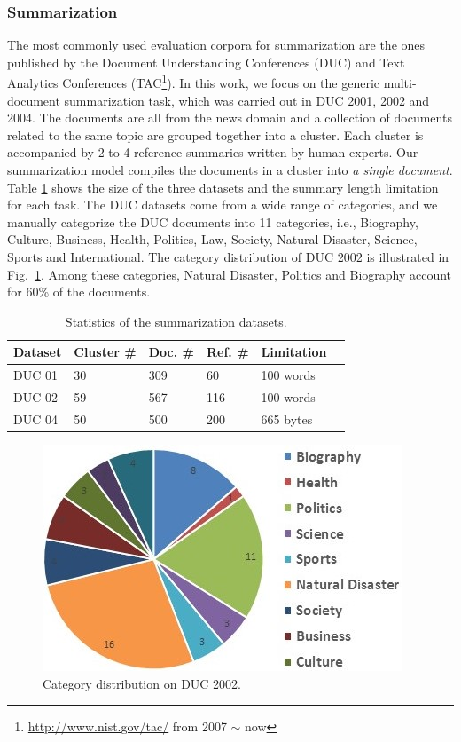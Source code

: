 \documentclass[letterpaper]{article}
\begin{document}
\subsubsection{Summarization}
The most commonly used evaluation corpora for summarization are the ones published by the Document Understanding Conferences (DUC) and Text Analytics Conferences (TAC\footnote{\url{http://www.nist.gov/tac/} from 2007 $\sim$ now}).
In this work, we focus on the generic multi-document summarization task, which was carried out in DUC 2001, 2002 and 2004.
The documents are all from the news domain and a collection of documents related to the same topic are grouped together into a cluster.
Each cluster is accompanied by 2 to 4 reference summaries written by human experts.
Our summarization model compiles the documents in a cluster into \textit{a single document}.
Table \ref{TB:dataset} shows the size of the three datasets and the summary length limitation for each task.
The DUC datasets come from a wide range of categories, and we manually categorize the DUC documents into 11 categories, i.e., Biography, Culture, Business, Health, Politics, Law, Society, Natural Disaster, Science, Sports and International.
The category distribution of DUC 2002 is illustrated in Fig.~\ref{fig:category}.
Among these categories, Natural Disaster, Politics and Biography account for 60\% of the documents.



\begin{table}[ht]
	\centering
	\small
	\begin{tabular}{l|lllll}
		\hline
		Dataset & Cluster \# & Doc. \#  & Ref. \#  &Limitation\\ \hline
		DUC 01  & 30         & 309                & 60    & 100 words       \\ \hline
		DUC 02  & 59         & 567                 & 116   &100 words       \\ \hline
		DUC 04  & 50         & 500                & 200    &665 bytes      \\ \hline
	\end{tabular}
	\caption{Statistics of the summarization datasets.}
	\label{TB:dataset}
\end{table}

\begin{figure}
	\centering
	\includegraphics[width=0.7\linewidth]{CategoryNumber}
	\caption{Category distribution on DUC 2002.}
	\label{fig:category}
\end{figure}
\end{document}
